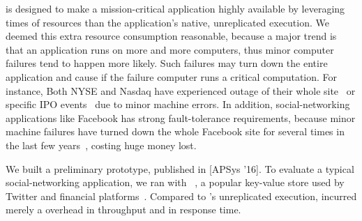  \tripod is designed to make a
mission-critical application highly available by leveraging  times of 
resources than the application's native, unreplicated execution. We deemed this 
extra resource consumption reasonable, because a major trend is that an 
application runs on more and more computers, thus minor computer failures tend 
to happen more likely. Such failures may turn down the entire application and 
cause if the failure computer runs a critical computation. For instance, Both 
NYSE and Nasdaq have experienced 
outage of their whole site~\cite{nyse:halt} or specific IPO 
events~\cite{facebook:ipo:delay} due to minor machine errors. 
In addition, social-networking applications like Facebook has 
strong fault-tolerance requirements, because minor machine failures have turned 
down the whole Facebook site for several times in the last few 
years~\cite{facebook:outage}, costing huge money lost. 




 We built a preliminary \tripod prototype, 
published in [APSys '16]. To evaluate a typical social-networking application, 
we ran \tripod with \memcached~\cite{memcached}, a popular key-value store used 
by Twitter and financial platforms~\cite{nosql:finance}. Compared to 
\memcached's unreplicated execution, \tripod incurred merely a \tputoverhead 
overhead in throughput and \latencyoverhead in response time.

